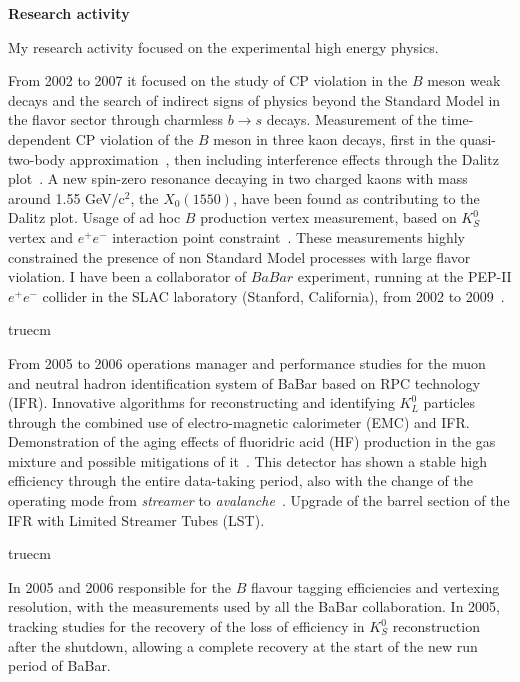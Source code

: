 \documentclass[11pt,twoside,a4paper]{article}
\begin{document}
\clearpage
\newpage 

\begin{center}
{\bf{Research activity}}
\end{center}
My research activity focused on the experimental high energy physics.

From 2002 to 2007 it focused on the study of CP violation in the $B$
meson weak decays and the search of indirect signs of physics beyond
the Standard Model in the flavor sector through charmless $b \to s$
decays. Measurement of the time-dependent CP violation of the $B$
meson in three kaon decays, first in the quasi-two-body
approximation~\cite{Aubert:2005ja,conf_aps,conf_win05}, then including
interference effects through the Dalitz
plot~\cite{Aubert:2007sd,Aubert:2007mj,talk_nagoya,DiMarco:2006wg,talk_ichep}.
A new spin-zero resonance decaying in two charged kaons with mass
around 1.55 GeV/c$^2$, the $X_0(1550)$, have been found as
contributing to the Dalitz plot. Usage of ad hoc $B$ production vertex
measurement, based on $K^0_S$ vertex and $e^+e^-$ interaction point
constraint~\cite{Aubert:2005dy,Aubert:2007me}. These measurements
highly constrained the presence of non Standard Model processes with
large flavor violation.  I have been a collaborator of $BaBar$
experiment, running at the PEP-II $e^+e^-$ collider in the SLAC
laboratory (Stanford, California), from 2002 to
2009~\cite{seminario_ucsd,seminario_princeton,seminario_roma1_1,seminario_roma1_2}.

 truecm

From 2005 to 2006 operations manager and performance studies for the
muon and neutral hadron identification system of BaBar based on RPC
technology (IFR). Innovative algorithms for reconstructing and
identifying $K^0_L$ particles through the combined use of
electro-magnetic calorimeter (EMC) and IFR. Demonstration of the
aging effects of fluoridric acid (HF) production in the gas mixture
and possible mitigations of it~\cite{Band:2008zzb}. This detector has
shown a stable high efficiency through the entire data-taking period,
also with the change of the operating mode from {\it streamer} to {\it
  avalanche}~\cite{BandProc,Anulli:2005wi}. Upgrade of the barrel section of 
the IFR with Limited Streamer Tubes (LST).

 truecm

In 2005 and 2006 responsible for the $B$ flavour tagging efficiencies
and vertexing resolution, with the measurements used by all the BaBar
collaboration.  In 2005, tracking studies for the recovery of the loss
of efficiency in $K^0_S$ reconstruction after the shutdown, allowing a
complete recovery at the start of the new run period of BaBar.
\end{document}
